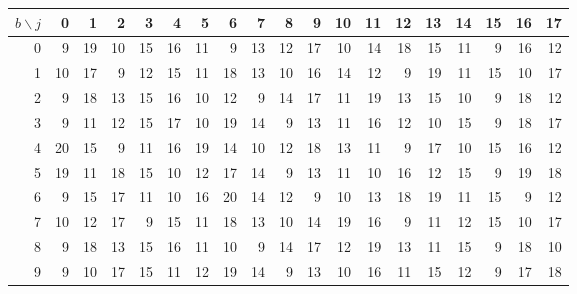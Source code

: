 \documentclass[11pt,reqno]{amsart}
\theoremstyle{plain}
\theoremstyle{plain}
\theoremstyle{plain}
\begin{document}
\begin{center}\small
\begin{tabular}{r|rrrrrrrrrrrrrrrrrr}
\toprule
$b\backslash j$ & 0 & 1 & 2 & 3 & 4 & 5 & 6 & 7 & 8 & 9 & 10 & 11 & 12 & 13 & 14 & 15 & 16 & 17 \\
\midrule
0 & 9 & 19 & 10 & 15 & 16 & 11 & 9 & 13 & 12 & 17 & 10 & 14 & 18 & 15 & 11 & 9 & 16 & 12 \\
1 & 10 & 17 & 9 & 12 & 15 & 11 & 18 & 13 & 10 & 16 & 14 & 12 & 9 & 19 & 11 & 15 & 10 & 17 \\
2 & 9 & 18 & 13 & 15 & 16 & 10 & 12 & 9 & 14 & 17 & 11 & 19 & 13 & 15 & 10 & 9 & 18 & 12 \\
3 & 9 & 11 & 12 & 15 & 17 & 10 & 19 & 14 & 9 & 13 & 11 & 16 & 12 & 10 & 15 & 9 & 18 & 17 \\
4 & 20 & 15 & 9 & 11 & 16 & 19 & 14 & 10 & 12 & 18 & 13 & 11 & 9 & 17 & 10 & 15 & 16 & 12 \\
5 & 19 & 11 & 18 & 15 & 10 & 12 & 17 & 14 & 9 & 13 & 11 & 10 & 16 & 12 & 15 & 9 & 19 & 18 \\
6 & 9 & 15 & 17 & 11 & 10 & 16 & 20 & 14 & 12 & 9 & 10 & 13 & 18 & 19 & 11 & 15 & 9 & 12 \\
7 & 10 & 12 & 17 & 9 & 15 & 11 & 18 & 13 & 10 & 14 & 19 & 16 & 9 & 11 & 12 & 15 & 10 & 17 \\
8 & 9 & 18 & 13 & 15 & 16 & 11 & 10 & 9 & 14 & 17 & 12 & 19 & 13 & 11 & 15 & 9 & 18 & 10 \\
9 & 9 & 10 & 17 & 15 & 11 & 12 & 19 & 14 & 9 & 13 & 10 & 16 & 11 & 15 & 12 & 9 & 17 & 18 \\
\bottomrule
\end{tabular}
\end{center}
\end{document}

